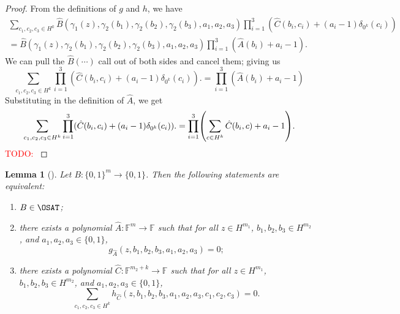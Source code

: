 \documentclass[english,12pt]{reedthesis}
\theoremstyle{plain}
\newtheorem{lemma}[lemma]{Lemma}
\theoremstyle{definition}
\theoremstyle{remark}
\newcommand{\TODO}[1]{\textcolor{red}{TODO: #1}}
\begin{document}
\begin{proof}
  From the definitions of $g$ and $h$, we have
  \begin{multline}\label{eqn:expand-gh-defs}
    \sum_{c_{1}, c_{2}, c_{3} \in H^{k}}\hat{B}(\gamma_{1}(z), \gamma_{2}(b_{1}), \gamma_{2}(b_{2}), \gamma_{2}(b_{3}), a_{1}, a_{2}, a_{3})
    \prod_{i=1}^{3}(\hat{C}(b_{i}, c_{i}) + (a_{i} - 1)\delta_{0^{k}}(c_{i})) \\
    = \hat{B}(\gamma_{1}(z), \gamma_{2}(b_{1}), \gamma_{2}(b_{2}), \gamma_{2}(b_{3}), a_{1}, a_{2}, a_{3})
    \prod_{i=1}^{3}(\hat{A}(b_{i}) + a_{i} - 1).
  \end{multline}
  We can pull the $\hat{B}(\cdots)$ call out of both sides and cancel them; giving us
  \begin{equation}\label{eqn:cancel-b-call}
    \sum_{c_{1}, c_{2}, c_{3} \in H^{k}}\prod_{i=1}^{3}(\hat{C}(b_{i}, c_{i}) + (a_{i} - 1)\delta_{0^{k}}(c_{i})).
    = \prod_{i=1}^{3}(\hat{A}(b_{i}) + a_{i} - 1)
  \end{equation}
  Substituting in the definition of $\hat{A}$, we get
  \begin{equation}\label{eqn:subst-a-def}
    \sum_{c_{1}, c_{2}, c_{3} \in H^{k}}\prod_{i=1}^{3}(\hat{C}(b_{i}, c_{i}) + (a_{i} - 1)\delta_{0^{k}}(c_{i})).
    = \prod_{i=1}^{3}\mleft(\sum_{c \in H^{k}}\hat{C}(b_{i}, c) + a_{i} - 1\mright).
  \end{equation}
  \TODO{}
\end{proof}

\begin{lemma}[{\cite[Claim 6.5]{GOS25}}]\label{lem:three-equiv}
  Let $B\colon \{0, 1\}^{m} \rightarrow \{0, 1\}$. Then the following statements are
  equivalent:
  \begin{enumerate}
    \item\label{item:b-in-osat} $B \in \OSAT$;
    \item\label{item:exists-a} there exists a polynomial
          $\hat{A}\colon \mathbb{F}^{m} \rightarrow \mathbb{F}$ such that for all
          $z \in H^{m_{1}}$, $b_{1}, b_{2}, b_{3} \in H^{m_{2}}$, and
          $a_{1}, a_{2}, a_{3} \in \{0, 1\}$,
          \begin{equation}
            g_{\hat{A}}(z, b_{1}, b_{2}, b_{3}, a_{1}, a_{2}, a_{3}) = 0;
          \end{equation}
    \item\label{item:exists-c} there exists a polynomial
          $\hat{C}\colon \mathbb{F}^{m_{2}+k} \rightarrow \mathbb{F}$ such that for all
          $z \in H^{m_{1}}$, $b_{1}, b_{2}, b_{3} \in H^{m_{2}}$, and
          $a_{1}, a_{2}, a_{3} \in \{0, 1\}$,
          \begin{equation}
            \sum_{c_{1}, c_{2}, c_{3} \in H^{k}}h_{\hat{C}}(z, b_{1}, b_{2}, b_{3}, a_{1}, a_{2}, a_{3}, c_{1}, c_{2}, c_{3}) = 0.
          \end{equation}
  \end{enumerate}
\end{lemma}
\end{document}
